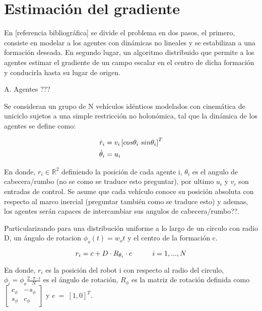 \newpage
\thispagestyle{empty}
\mbox{}

\chapter{Estimación del gradiente}
\label{ch:chapter3}

En [referencia bibliográfica] se divide el problema en dos pasos, el primero, consiste en modelar a los agentes con dinámicas no lineales y se estabilizan a una formación deseada. En segundo lugar, un algoritmo distribuido que permite a los agentes estimar el gradiente de un campo escalar en el centro de dicha formación y conducirla hasta su lugar de origen.

A. Agentes ??? 

Se consideran un grupo de N vehículos idénticos modelados con cinemática de uniciclo sujetos a una simple restricción no holonómica, tal que la dinámica de los agentes se define como:

\begin{equation*}
	\begin{aligned}
		\dot{r}_i&=v_i\left[cos\theta_i\hspace{1mm}sin\theta_i\right]^T\\
		\dot{\theta}_i&=u_i
	\end{aligned}
\end{equation*}

En donde, $r_i\in\mathbb{R}^2$ definiendo la posición de cada agente i, $\theta_i$ es el angulo de cabecera/rumbo (no se como se traduce esto preguntar), por ultimo $u_i$ y $v_i$ son entradas de control. Se asume que cada vehículo conoce su posición absoluta con respecto al marco inercial (preguntar también como se traduce esto) y ademas, los agentes serán capaces de intercambiar sus angulos de cabecera/rumbo??.

Particularizando para una distribución uniforme a lo largo de un circulo con radio D, un ángulo de rotacion $\phi_o\left(t\right)=w_ot$ y el centro de la formación c. 

\begin{equation*}
	r_i = c + D\cdot{R}_{\theta_i}\cdot{e}\hspace{10mm}{i = 1,...,N}
\end{equation*}

En donde, $r_{i}$ es la posición del robot i con respecto al radio del circulo, ${\phi }_{i}=\phi_o\frac{2\cdot\pi\cdot{i}}{N}$ es el ángulo de rotación, $R_{\phi }$ es la matriz de rotación definida como $\left[ \begin{array}{cc} {c}_{\phi } & -{s}_{\phi } \\  {s}_{\phi } & {c}_{\phi } \end{array} \right]$ y  $e\ =\ {\left[1,0\right]}^T$.

